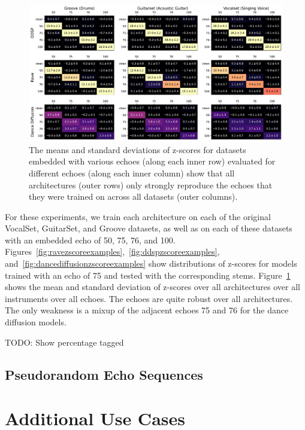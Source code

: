 \documentclass[letterpaper]{article} %
\begin{document}
\begin{figure}
    \centering
    \includegraphics[width=\textwidth]{figs/AllSingleEchoZScores.pdf}
    
    \caption{The means and standard deviations of z-scores for datasets embedded with various echoes (along each inner row) evaluated for different echoes (along each inner column) show that all architectures (outer rows) only strongly reproduce the echoes that they were trained on across all datasets (outer columns).}
    \label{fig:singleechotable}
\end{figure}

For these experiments, we train each architecture on each of the original VocalSet, GuitarSet, and Groove datasets, as well as on each of these datasets with an embedded echo of 50, 75, 76, and 100.  Figures~\ref{fig:ravezscoreexamples},~\ref{fig:ddspzscoreexamples}, and~\ref{fig:dancediffusionzscoreexamples} show distributions of z-scores for models trained with an echo of 75 and tested with the corresponding stems.  Figure~\ref{fig:singleechotable} shows the mean and standard deviation of z-scores over all architectures over all instruments over all echoes.  The echoes are quite robust over all architectures.  The only weakness is a mixup of the adjacent echoes 75 and 76 for the dance diffusion models.


TODO: Show percentage tagged




\subsection{Pseudorandom Echo Sequences}



\section{Additional Use Cases}
\end{document}
